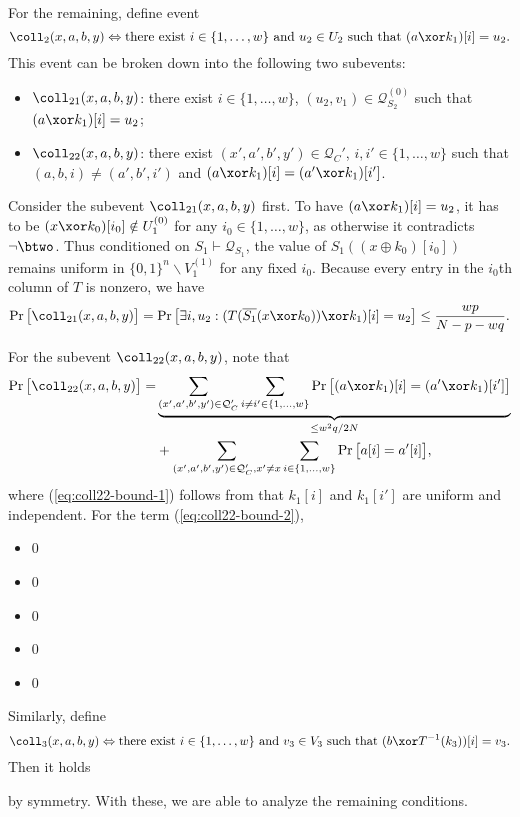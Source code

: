 
\smallskip

For the remaining, define event
%
$$\coll_2(x,a,b,y)\Leftrightarrow\text{there exist }i\in\{1,\ldots,w\}
\text{ and }
u_2\in U_2
\text{ such that }
(a\xor k_1)[i]=u_2.$$
%
This event can be broken down into the following two subevents:
%
\begin{itemize}
	\item $\coll_{21}(x,a,b,y)$: there exist $i\in\{1,\ldots,w\}$, $(u_2,v_1)\in\mathcal{Q}_{S_2}^{(0)}$ such that $(a\xor k_1)[i]=u_2$;
	\item $\coll_{22}(x,a,b,y)$: there exist $(x',a',b',y')\in\mathcal{Q}_C'$, $i,i'\in\{1,\ldots,w\}$ such that $(a,b,i)\neq(a',b',i')$ and $(a\xor k_1)[i]=(a'\xor k_1)[i']$.
\end{itemize}
%
Consider the subevent $\coll_{21}(x,a,b,y)$ first. To have $(a\xor k_1)[i]=u_2$, it has to be $(x\xor k_0)[i_0]\notin U_1^{(0)}$ for any $i_0\in\{1,\ldots,w\}$, as otherwise it contradicts $\neg\btwo$. Thus conditioned on $S_{1} \vdash \mathcal{Q}_{S_{1}}$, the value of $S_1((x \oplus k_0)[i_0])$ remains uniform in $\{0, 1\}^{n} \backslash V_1^{(1)}$ for any fixed $i_0$. Because every entry in the $i_{0}$th column of $T$ is nonzero, we have
%
$$\Pr\big[\coll_{21}(x,a,b,y)\big]=\Pr\big[\exists i,u_2:(T(\overline{S_1}(x\xor k_0))\xor k_1)[i]=u_2\big]\leq\frac{wp}{N-p-wq}.$$
%


For the subevent $\coll_{22}(x,a,b,y)$, note that        {\small
%
\begin{align}
\Pr\big[\coll_{22}(x,a,b,y)\big]        
= &  \underbrace{\sum_{(x',a',b',y')\in\mathcal{Q}_C'}\sum_{i\neq i'\in\{1,\ldots,w\}}\Pr\big[(a\xor k_1)[i]=(a'\xor k_1)[i']\big]}_{\leq w^2q/2N}      
\label{eq:coll22-bound-1}       \\
 & +  \sum_{(x',a',b',y')\in\mathcal{Q}_C',x'\neq x}\sum_{i\in\{1,\ldots,w\}}\Pr\big[a[i]=a'[i]\big] ,
\label{eq:coll22-bound-2}
\end{align}
}%
%
where (\ref{eq:coll22-bound-1}) follows from that $k_1[i]$ and $k_1[i']$ are uniform and independent. For the term (\ref{eq:coll22-bound-2}),
\begin{itemize}
	\item0
	\item0
	\item0
	\item0
	\item0
\end{itemize}




Similarly, define
%
$$\coll_3(x,a,b,y)\Leftrightarrow\text{there exist }i\in\{1,\ldots,w\}
\text{ and }
v_3\in V_3
\text{ such that }
(b\xor T^{-1}(k_3))[i]=v_3.$$
%
Then it holds
%

%
by symmetry. With these, we are able to analyze the remaining conditions.

